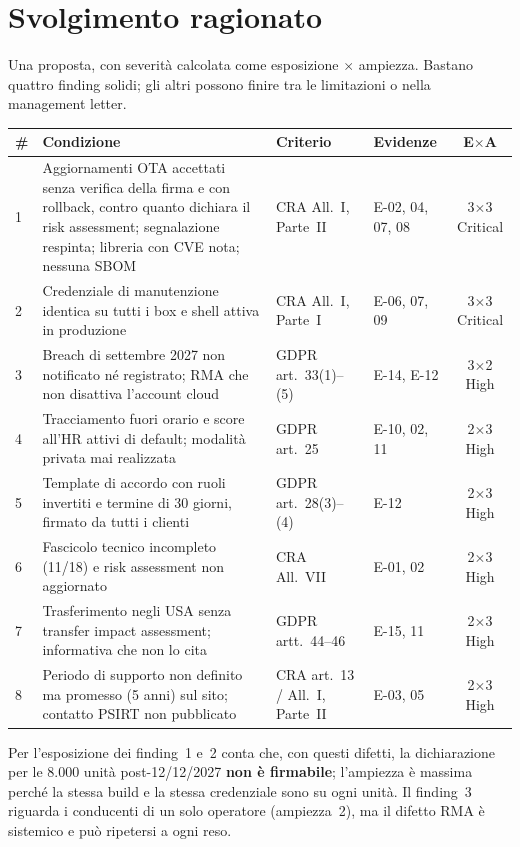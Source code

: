 \section{Svolgimento ragionato}

\begin{integrazione}
Una proposta, con severità calcolata come esposizione $\times$ ampiezza. Bastano quattro finding
solidi; gli altri possono finire tra le limitazioni o nella management letter.
\begin{center}
\small
\begin{tabularx}{\linewidth}{l X l l c}
\toprule
\textbf{\#} & \textbf{Condizione} & \textbf{Criterio} & \textbf{Evidenze} & \textbf{E$\times$A} \\ \midrule
1 & Aggiornamenti OTA accettati senza verifica della firma e con rollback, contro quanto dichiara il
  risk assessment; segnalazione respinta; libreria con CVE nota; nessuna SBOM &
  CRA All.~I, Parte~II & E-02, 04, 07, 08 & 3$\times$3 Critical \\
2 & Credenziale di manutenzione identica su tutti i box e shell attiva in produzione &
  CRA All.~I, Parte~I & E-06, 07, 09 & 3$\times$3 Critical \\
3 & Breach di settembre 2027 non notificato né registrato; RMA che non disattiva l'account cloud &
  GDPR art.~33(1)--(5) & E-14, E-12 & 3$\times$2 High \\
4 & Tracciamento fuori orario e score all'HR attivi di default; modalità privata mai realizzata &
  GDPR art.~25 & E-10, 02, 11 & 2$\times$3 High \\
5 & Template di accordo con ruoli invertiti e termine di 30 giorni, firmato da tutti i clienti &
  GDPR art.~28(3)--(4) & E-12 & 2$\times$3 High \\
6 & Fascicolo tecnico incompleto (11/18) e risk assessment non aggiornato & CRA All.~VII &
  E-01, 02 & 2$\times$3 High \\
7 & Trasferimento negli USA senza transfer impact assessment; informativa che non lo cita &
  GDPR artt.~44--46 & E-15, 11 & 2$\times$3 High \\
8 & Periodo di supporto non definito ma promesso (5 anni) sul sito; contatto PSIRT non pubblicato &
  CRA art.~13 / All.~I, Parte~II & E-03, 05 & 2$\times$3 High \\
\bottomrule
\end{tabularx}
\end{center}
Per l'esposizione dei finding~1 e~2 conta che, con questi difetti, la dichiarazione per le 8.000
unità post-12/12/2027 \textbf{non è firmabile}; l'ampiezza è massima perché la stessa build e la
stessa credenziale sono su ogni unità. Il finding~3 riguarda i conducenti di un solo operatore
(ampiezza~2), ma il difetto RMA è sistemico e può ripetersi a ogni reso.


\end{integrazione}
